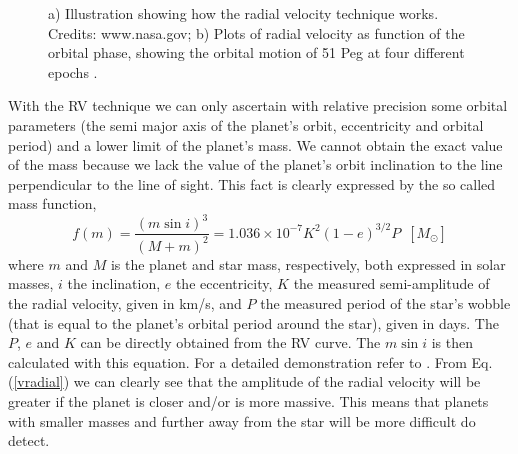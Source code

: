 \documentclass[dvips,12pt,a4paper]{report}
\begin{document}
\begin{figure}[h]
\centering
{}
\caption[The RV Technique illustration and plots]{a) Illustration showing how the radial velocity technique works. Credits: www.nasa.gov; b) Plots of radial velocity as function of the orbital phase, showing the orbital motion of 51 Peg at four different epochs \citep{Mayor-1995}.}
\label{rvpic}
\end{figure}

With the RV technique we can only ascertain with relative precision some orbital parameters (the semi major axis of the planet's orbit, eccentricity and orbital period) and a lower limit of the planet's mass. We cannot obtain the exact value of the mass because we lack the value of the planet's orbit inclination to the line perpendicular to the line of sight. This fact is clearly expressed by the so called mass function,
\begin{equation}
 f(m)=\frac{(m \sin i)^3}{(M+m)^2}=1.036\times10^{-7}K^2(1-e)^{3/2}P\,\,\, [M_\odot]
\label {vradial}
\end{equation}
where $m$ and $M$ is the planet and star mass, respectively, both expressed in solar masses, $i$ the inclination, $e$ the eccentricity, $K$ the measured semi-amplitude of the radial velocity, given in km/s, and $P$ the measured period of the star's wobble (that is equal to the planet's orbital period around the star), given in days. The $P$, $e$ and $K$ can be directly obtained from the RV curve. The $m \sin i$ is then calculated with this equation. For a detailed demonstration refer to \citet{Santos-2008}. From Eq. (\ref{vradial}) we can clearly see that the amplitude of the radial velocity will be greater if the planet is closer and/or is more massive. This means that planets with smaller masses and further away from the star will be more difficult do detect.
\end{document}
